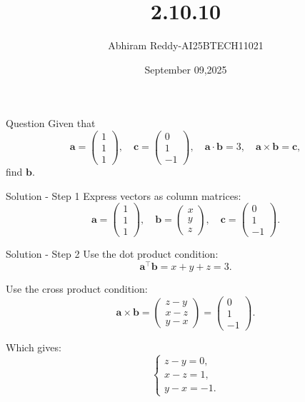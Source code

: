 \documentclass{beamer}
\title 
{2.10.10}
\date{September 09,2025}
\author 
{Abhiram Reddy-AI25BTECH11021}
\begin{document}
\frame{\titlepage}

\begin{frame}{Question}
Given that
\[
\mathbf{a} = \begin{pmatrix} 1 \\ 1 \\ 1 \end{pmatrix}, \quad
\mathbf{c} = \begin{pmatrix} 0 \\ 1 \\ -1 \end{pmatrix}, \quad
\mathbf{a} \cdot \mathbf{b} = 3, \quad
\mathbf{a} \times \mathbf{b} = \mathbf{c},
\]
find \(\mathbf{b}\).
\end{frame}

\begin{frame}{Solution - Step 1}
Express vectors as column matrices:
\[
\mathbf{a} = \begin{pmatrix} 1 \\ 1 \\ 1 \end{pmatrix}, \quad
\mathbf{b} = \begin{pmatrix} x \\ y \\ z \end{pmatrix}, \quad
\mathbf{c} = \begin{pmatrix} 0 \\ 1 \\ -1 \end{pmatrix}.
\]
\end{frame}

\begin{frame}{Solution - Step 2}
Use the dot product condition:
\[
\mathbf{a}^\top \mathbf{b} = x + y + z = 3.
\]

Use the cross product condition:
\[
\mathbf{a} \times \mathbf{b} = 
\begin{pmatrix}
z - y \\
x - z \\
y - x
\end{pmatrix}
= 
\begin{pmatrix}
0 \\
1 \\
-1
\end{pmatrix}.
\]

Which gives:
\[
\begin{cases}
z - y = 0, \\
x - z = 1, \\
y - x = -1.
\end{cases}
\]
\end{frame}
\end{document}
